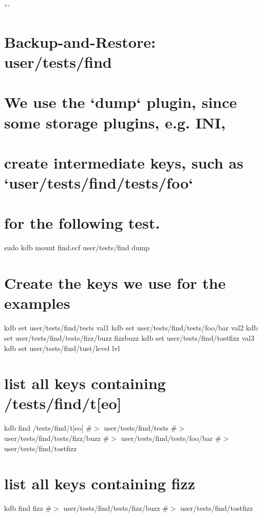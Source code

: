 ``` \hypertarget{doc_help_kdb-find_md_autotoc_md1824}{}\section{Backup-\/and-\/\+Restore\+: user/tests/find}\label{doc_help_kdb-find_md_autotoc_md1824}
\hypertarget{doc_help_kdb-find_md_autotoc_md1825}{}\section{We use the `dump` plugin, since some storage plugins, e.\+g. I\+N\+I,}\label{doc_help_kdb-find_md_autotoc_md1825}
\hypertarget{doc_help_kdb-find_md_autotoc_md1826}{}\section{create intermediate keys, such as `user/tests/find/tests/foo`}\label{doc_help_kdb-find_md_autotoc_md1826}
\hypertarget{doc_help_kdb-find_md_autotoc_md1827}{}\section{for the following test.}\label{doc_help_kdb-find_md_autotoc_md1827}
sudo kdb mount find.\+ecf user/tests/find dump\hypertarget{doc_help_kdb-find_md_autotoc_md1828}{}\section{Create the keys we use for the examples}\label{doc_help_kdb-find_md_autotoc_md1828}
kdb set user/tests/find/tests val1 kdb set user/tests/find/tests/foo/bar val2 kdb set user/tests/find/tests/fizz/buzz fizzbuzz kdb set user/tests/find/tostfizz val3 kdb set user/tests/find/tust/level lvl\hypertarget{doc_help_kdb-find_md_autotoc_md1829}{}\section{list all keys containing /tests/find/t\mbox{[}eo\mbox{]}}\label{doc_help_kdb-find_md_autotoc_md1829}
kdb find \textquotesingle{}/tests/find/t\mbox{[}eo\mbox{]}\textquotesingle{} \#$>$ user/tests/find/tests \#$>$ user/tests/find/tests/fizz/buzz \#$>$ user/tests/find/tests/foo/bar \#$>$ user/tests/find/tostfizz\hypertarget{doc_help_kdb-find_md_autotoc_md1830}{}\section{list all keys containing fizz}\label{doc_help_kdb-find_md_autotoc_md1830}
kdb find \textquotesingle{}fizz\textquotesingle{} \#$>$ user/tests/find/tests/fizz/buzz \#$>$ user/tests/find/tostfizz

